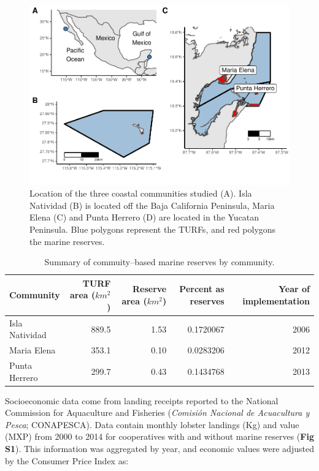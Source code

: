 \documentclass{frontiersSCNS}
\theoremstyle{definition}
\theoremstyle{definition}
\theoremstyle{definition}
\theoremstyle{remark}
\begin{document}
\begin{figure}
\centering
\includegraphics{Villasenor-Derbez_files/figure-latex/unnamed-chunk-1-1.pdf}
\caption{\label{fig:unnamed-chunk-1}\label{fig:map}Location of the three
coastal communities studied (A). Isla Natividad (B) is located off the
Baja California Peninsula, Maria Elena (C) and Punta Herrero (D) are
located in the Yucatan Peninsula. Blue polygons represent the TURFs, and
red polygons the marine reserves.}
\end{figure}

\begin{table}

\caption{\label{tab:unnamed-chunk-2}\label{table:com_sum} Summary of commuity--based marine reserves by community.}
\centering
\begin{tabular}[t]{l|r|r|r|r}
\hline
Community & TURF area ($km^2$) & Reserve area ($km^2$) & Percent as reserves & Year of implementation\\
\hline
Isla Natividad & 889.5 & 1.53 & 0.1720067 & 2006\\
\hline
Maria Elena & 353.1 & 0.10 & 0.0283206 & 2012\\
\hline
Punta Herrero & 299.7 & 0.43 & 0.1434768 & 2013\\
\hline
\end{tabular}
\end{table}

Socioeconomic data come from landing receipts reported to the National
Commission for Aquaculture and Fisheries (\emph{Comisión Nacional de
Acuacultura y Pesca}; CONAPESCA). Data contain monthly lobster landings
(Kg) and value (MXP) from 2000 to 2014 for cooperatives with and without
marine reserves (\textbf{Fig S1}). This information was aggregated by
year, and economic values were adjusted by the Consumer Price Index
\citep{oecd_2017-VV} as:
\end{document}
